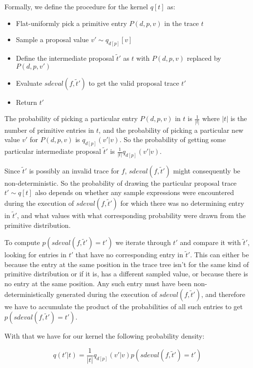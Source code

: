 Formally, we define the procedure for the kernel $q[t]$ as:

\begin{minipage}{\linewidth}
\begin{itemize}
\item Flat-uniformly pick a primitive entry $P(d,p,v)$ in the trace $t$
\item Sample a proposal value $v' \sim q_{d[p]}[v]$
\item Define the intermediate proposal $\tilde{t}'$ as $t$ with $P(d,p,v)$ replaced by $P(d,p,v')$
\item Evaluate $sdeval(f,\tilde{t}')$ to get the valid proposal trace $t'$
\item Return $t'$
\end{itemize}
\end{minipage}

The probability of picking a particular entry $P(d,p,v)$ in $t$ is $\frac{1}{|t|}$ where $|t|$ is the number of primitive entries in $t$, and the probability of picking a particular new value $v'$ for $P(d,p,v)$ is $q_{d[p]}(v' | v)$. So the probability of getting some particular intermediate proposal $\tilde{t}'$ is $\frac{1}{|t|} q_{d[p]}(v' | v)$.

Since $\tilde{t}'$ is possibly an invalid trace for $f$, $sdeval(f,\tilde{t}')$ might consequently be non-deterministic. So the probability of drawing the particular proposal trace $t' \sim q[t]$ also depends on whether any sample expressions were encountered during the execution of $sdeval(f, \tilde{t}')$ for which there was no determining entry in $\tilde{t}'$, and what values with what corresponding probability were drawn from the primitive distribution.

To compute $p(sdeval(f,\tilde{t}') = t')$ we iterate through $t'$ and compare it with $\tilde{t}'$, looking for entries in $t'$ that have no corresponding entry in $\tilde{t}'$. This can either be because the entry at the same position in the trace tree isn't for the same kind of primitive distribution or if it is, has a different sampled value, or because there is no entry at the same position. Any such entry must have been non-deterministically generated during the execution of $sdeval(f,\tilde{t}')$, and therefore we have to accumulate the product of the probabilities of all such entries to get $p(sdeval(f,\tilde{t}') = t')$.

With that we have for our kernel the following probability density:

\begin{equation*}
     q(t' | t) = \frac{1}{|t|} q_{d[p]}(v' | v) p(sdeval(f,\tilde{t}') = t')
\end{equation*}

